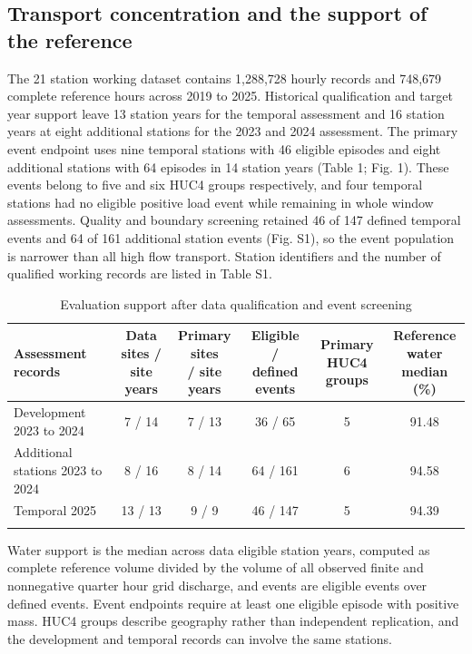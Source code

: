 \documentclass[pdflatex,sn-mathphys-num]{sn-jnl}%
\theoremstyle{thmstyleone}%
\theoremstyle{thmstyletwo}%
\theoremstyle{thmstylethree}%
\begin{document}
\subsection{Transport concentration and the support of the reference}

The 21 station working dataset contains 1,288,728 hourly records and 748,679 complete reference hours across 2019 to 2025. Historical qualification and target year support leave 13 station years for the temporal assessment and 16 station years at eight additional stations for the 2023 and 2024 assessment. The primary event endpoint uses nine temporal stations with 46 eligible episodes and eight additional stations with 64 episodes in 14 station years (Table 1; Fig. 1). These events belong to five and six HUC4 groups respectively, and four temporal stations had no eligible positive load event while remaining in whole window assessments. Quality and boundary screening retained 46 of 147 defined temporal events and 64 of 161 additional station events (Fig. S1), so the event population is narrower than all high flow transport. Station identifiers and the number of qualified working records are listed in Table S1.

\begin{table}[htbp]
\caption{Evaluation support after data qualification and event screening}\label{tab:1}
\footnotesize
\setlength{\tabcolsep}{2pt}
\begin{tabular}{@{}lccccc@{}}
\toprule
\shortstack{Assessment\\records} & \shortstack{Data sites /\\site years} & \shortstack{Primary sites\\/ site years} & \shortstack{Eligible /\\defined events} & \shortstack{Primary HUC4\\groups} & \shortstack{Reference\\water median\\(\%)}\\
\midrule
Development 2023 to 2024 & 7 / 14 & 7 / 13 & 36 / 65 & 5 & 91.48\\
Additional stations 2023 to 2024 & 8 / 16 & 8 / 14 & 64 / 161 & 6 & 94.58\\
Temporal 2025 & 13 / 13 & 9 / 9 & 46 / 147 & 5 & 94.39\\
\botrule
\end{tabular}
\end{table}

Water support is the median across data eligible station years, computed as complete reference volume divided by the volume of all observed finite and nonnegative quarter hour grid discharge, and events are eligible events over defined events. Event endpoints require at least one eligible episode with positive mass. HUC4 groups describe geography rather than independent replication, and the development and temporal records can involve the same stations.
\end{document}
